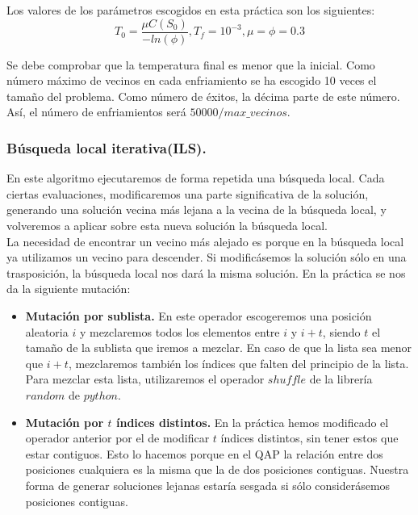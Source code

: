 Los valores de los parámetros escogidos en esta práctica son los siguientes:\\

\[T_0=\dfrac{\mu C(S_0)}{-ln(\phi)},T_f=10^{-3},\mu=\phi=0.3\]

Se debe comprobar que la temperatura final es menor que la inicial. Como número máximo de vecinos en cada enfriamiento se ha escogido 10 veces el tamaño del problema. Como número de éxitos, la décima parte de este número. Así, el número de enfriamientos será $50000/max\_vecinos$.



\subsubsection{Búsqueda local iterativa(ILS).}

En este algoritmo ejecutaremos de forma repetida una búsqueda local. Cada ciertas evaluaciones, modificaremos una parte significativa de la solución, generando una solución vecina más lejana a la vecina de la búsqueda local, y volveremos a aplicar sobre esta nueva solución la búsqueda local. \\

La necesidad de encontrar un vecino más alejado es porque en la búsqueda local ya utilizamos un vecino para descender. Si modificásemos la solución sólo en una trasposición, la búsqueda local nos dará la misma solución. En la práctica se nos da la siguiente mutación:\\

\begin{itemize}
	\item \textbf{Mutación por sublista.} En este operador escogeremos una posición aleatoria $i$ y mezclaremos todos los elementos entre $i$ y $i+t$, siendo $t$ el tamaño de la sublista que  iremos a mezclar. En caso de que la lista sea menor que $i+t$, mezclaremos también los índices que falten del principio de la lista. Para mezclar esta lista, utilizaremos el operador $shuffle$ de la librería $random$ de $python$.
	
	\item \textbf{Mutación por $t$ índices distintos.} En la práctica hemos modificado el operador anterior por el de modificar $t$ índices distintos, sin tener estos que estar contiguos. Esto lo hacemos porque en el QAP la relación entre dos posiciones cualquiera es la misma que la de dos posiciones contiguas. Nuestra forma de generar soluciones lejanas estaría sesgada si sólo considerásemos posiciones contiguas.
\end{itemize}

